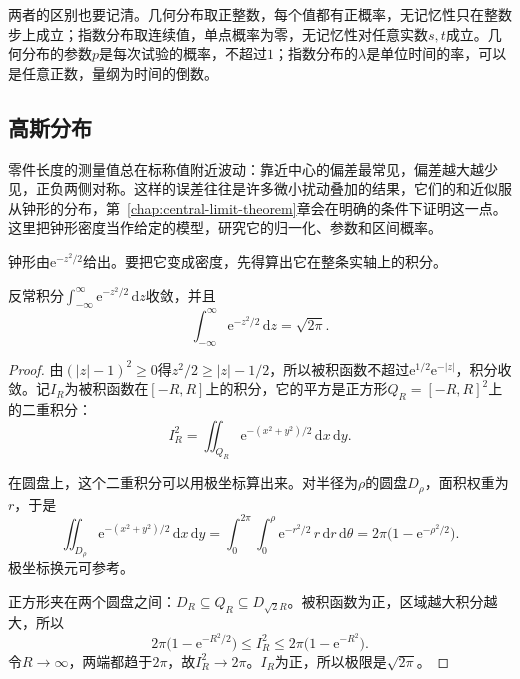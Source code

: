 两者的区别也要记清。几何分布取正整数，每个值都有正概率，无记忆性只在整数步上成立；指数分布取连续值，单点概率为零，无记忆性对任意实数$s,t$成立。几何分布的参数$p$是每次试验的概率，不超过$1$；指数分布的$\lambda$是单位时间的率，可以是任意正数，量纲为时间的倒数。

\subsection{高斯分布}
\label{sec:cdist-gaussian}

零件长度的测量值总在标称值附近波动：靠近中心的偏差最常见，偏差越大越少见，正负两侧对称。这样的误差往往是许多微小扰动叠加的结果，它们的和近似服从钟形的分布，第~\ref{chap:central-limit-theorem}章会在明确的条件下证明这一点。这里把钟形密度当作给定的模型，研究它的归一化、参数和区间概率。

钟形由$\mathrm{e}^{-z^{2}/2}$给出。要把它变成密度，先得算出它在整条实轴上的积分。

\begin{lemma}[Gauss积分]
\label{lem:cdist-gauss-integral}
反常积分$\int_{-\infty}^{\infty}\mathrm{e}^{-z^{2}/2}\,\mathrm{d}z$收敛，并且
\begin{equation}
  \int_{-\infty}^{\infty}\mathrm{e}^{-z^{2}/2}\,\mathrm{d}z=\sqrt{2\pi}.
  \label{eq:cdist-gauss-integral}
\end{equation}
\end{lemma}

\begin{proof}
由$(\lvert z\rvert-1)^{2}\geq0$得$z^{2}/2\geq\lvert z\rvert-1/2$，所以被积函数不超过$\mathrm{e}^{1/2}\mathrm{e}^{-\lvert z\rvert}$，积分收敛。记$I_R$为被积函数在$[-R,R]$上的积分，它的平方是正方形$Q_R=[-R,R]^{2}$上的二重积分：
\[
  I_R^{2}=\iint_{Q_R}\mathrm{e}^{-(x^{2}+y^{2})/2}\,\mathrm{d}x\,\mathrm{d}y .
\]

在圆盘上，这个二重积分可以用极坐标算出来。对半径为$\rho$的圆盘$D_\rho$，面积权重为$r$，于是
\[
  \iint_{D_\rho}\mathrm{e}^{-(x^{2}+y^{2})/2}\,\mathrm{d}x\,\mathrm{d}y
  =\int_0^{2\pi}\!\!\int_0^{\rho}\mathrm{e}^{-r^{2}/2}\,r\,\mathrm{d}r\,\mathrm{d}\theta
  =2\pi\bigl(1-\mathrm{e}^{-\rho^{2}/2}\bigr).
\]
极坐标换元可参考。

正方形夹在两个圆盘之间：$D_R\subseteq Q_R\subseteq D_{\sqrt2R}$。被积函数为正，区域越大积分越大，所以
\[
  2\pi\bigl(1-\mathrm{e}^{-R^{2}/2}\bigr)\leq I_R^{2}\leq2\pi\bigl(1-\mathrm{e}^{-R^{2}}\bigr).
\]
令$R\to\infty$，两端都趋于$2\pi$，故$I_R^{2}\to2\pi$。$I_R$为正，所以极限是$\sqrt{2\pi}$。
\end{proof}

